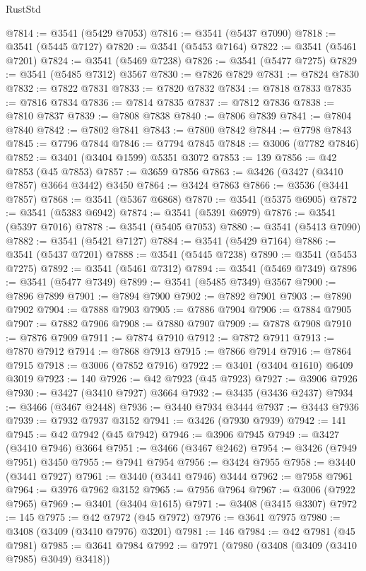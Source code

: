 \begin{lexlean}{RustStd}
\begin{coremodule}
@7814 := @3541 (@5429 @7053)
@7816 := @3541 (@5437 @7090)
@7818 := @3541 (@5445 @7127)
@7820 := @3541 (@5453 @7164)
@7822 := @3541 (@5461 @7201)
@7824 := @3541 (@5469 @7238)
@7826 := @3541 (@5477 @7275)
@7829 := @3541 (@5485 @7312) @3567
@7830 := @7826 @7829
@7831 := @7824 @7830
@7832 := @7822 @7831
@7833 := @7820 @7832
@7834 := @7818 @7833
@7835 := @7816 @7834
@7836 := @7814 @7835
@7837 := @7812 @7836
@7838 := @7810 @7837
@7839 := @7808 @7838
@7840 := @7806 @7839
@7841 := @7804 @7840
@7842 := @7802 @7841
@7843 := @7800 @7842
@7844 := @7798 @7843
@7845 := @7796 @7844
@7846 := @7794 @7845
@7848 := @3006 (@7782 @7846)
@7852 := @3401 (@3404 @1599) @5351 @3072
@7853 := 139
@7856 := @42 @7853 (@45 @7853)
@7857 := @3659 @7856
@7863 := @3426 (@3427 (@3410 @7857) @3664 @3442) @3450
@7864 := @3424 @7863
@7866 := @3536 (@3441 @7857)
@7868 := @3541 (@5367 @6868)
@7870 := @3541 (@5375 @6905)
@7872 := @3541 (@5383 @6942)
@7874 := @3541 (@5391 @6979)
@7876 := @3541 (@5397 @7016)
@7878 := @3541 (@5405 @7053)
@7880 := @3541 (@5413 @7090)
@7882 := @3541 (@5421 @7127)
@7884 := @3541 (@5429 @7164)
@7886 := @3541 (@5437 @7201)
@7888 := @3541 (@5445 @7238)
@7890 := @3541 (@5453 @7275)
@7892 := @3541 (@5461 @7312)
@7894 := @3541 (@5469 @7349)
@7896 := @3541 (@5477 @7349)
@7899 := @3541 (@5485 @7349) @3567
@7900 := @7896 @7899
@7901 := @7894 @7900
@7902 := @7892 @7901
@7903 := @7890 @7902
@7904 := @7888 @7903
@7905 := @7886 @7904
@7906 := @7884 @7905
@7907 := @7882 @7906
@7908 := @7880 @7907
@7909 := @7878 @7908
@7910 := @7876 @7909
@7911 := @7874 @7910
@7912 := @7872 @7911
@7913 := @7870 @7912
@7914 := @7868 @7913
@7915 := @7866 @7914
@7916 := @7864 @7915
@7918 := @3006 (@7852 @7916)
@7922 := @3401 (@3404 @1610) @6409 @3019
@7923 := 140
@7926 := @42 @7923 (@45 @7923)
@7927 := @3906 @7926
@7930 := @3427 (@3410 @7927) @3664
@7932 := @3435 (@3436 @2437)
@7934 := @3466 (@3467 @2448)
@7936 := @3440 @7934 @3444
@7937 := @3443 @7936
@7939 := @7932 @7937 @3152
@7941 := @3426 (@7930 @7939)
@7942 := 141
@7945 := @42 @7942 (@45 @7942)
@7946 := @3906 @7945
@7949 := @3427 (@3410 @7946) @3664
@7951 := @3466 (@3467 @2462)
@7954 := @3426 (@7949 @7951) @3450
@7955 := @7941 @7954
@7956 := @3424 @7955
@7958 := @3440 (@3441 @7927)
@7961 := @3440 (@3441 @7946) @3444
@7962 := @7958 @7961
@7964 := @3976 @7962 @3152
@7965 := @7956 @7964
@7967 := @3006 (@7922 @7965)
@7969 := @3401 (@3404 @1615)
@7971 := @3408 (@3415 @3307)
@7972 := 145
@7975 := @42 @7972 (@45 @7972)
@7976 := @3641 @7975
@7980 := @3408 (@3409 (@3410 @7976) @3201)
@7981 := 146
@7984 := @42 @7981 (@45 @7981)
@7985 := @3641 @7984
@7992 := @7971 (@7980 (@3408 (@3409 (@3410 @7985) @3049) @3418))

\end{coremodule}
\end{lexlean}
